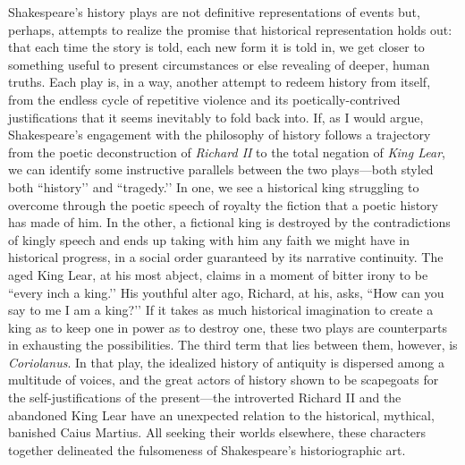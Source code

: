 Shakespeare’s history plays are not definitive representations of events but, perhaps, attempts to realize the promise that historical representation holds out: that each time the story is told, each new form it is told in, we get closer to something useful to present circumstances or else revealing of deeper, human truths.
Each play is, in a way, another attempt to redeem history from itself, from the endless cycle of repetitive violence and its poetically-contrived justifications that it seems inevitably to fold back into.
If, as I would argue, Shakespeare’s engagement with the philosophy of history follows a trajectory from the poetic deconstruction of \emph{Richard II} to the total negation of \emph{King Lear}, we can identify some instructive parallels between the two plays---both styled both ``history’’ and ``tragedy.’’ In one, we see a historical king struggling to overcome through the poetic speech of royalty the fiction that a poetic history has made of him.
In the other, a fictional king is destroyed by the contradictions of kingly speech and ends up taking with him any faith we might have in historical progress, in a social order guaranteed by its narrative continuity.
The aged King Lear, at his most abject, claims in a moment of bitter irony to be ``every inch a king.’’ His youthful alter ago, Richard, at his, asks, ``How can you say to me I am a king?’’ If it takes as much historical imagination to create a king as to keep one in power as to destroy one, these two plays are counterparts in exhausting the possibilities.
The third term that lies between them, however, is \emph{Coriolanus}.
In that play, the idealized history of antiquity is dispersed among a multitude of voices, and the great actors of history shown to be scapegoats for the self-justifications of the present---the introverted Richard II and the abandoned King Lear have an unexpected relation to the historical, mythical, banished Caius Martius.
All seeking their worlds elsewhere, these characters together delineated the fulsomeness of Shakespeare’s historiographic art.